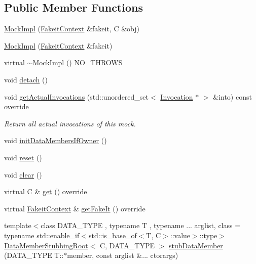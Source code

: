 \subsection*{Public Member Functions}
\begin{DoxyCompactItemize}
\item 
\mbox{\hyperlink{classfakeit_1_1MockImpl_aeabb99e36f2ef5fea7856db165fe01d3}{Mock\+Impl}} (\mbox{\hyperlink{structfakeit_1_1FakeitContext}{Fakeit\+Context}} \&fakeit, C \&obj)
\item 
\mbox{\hyperlink{classfakeit_1_1MockImpl_ae6f86001c16b110046453433ba2d36e8}{Mock\+Impl}} (\mbox{\hyperlink{structfakeit_1_1FakeitContext}{Fakeit\+Context}} \&fakeit)
\item 
virtual \mbox{\hyperlink{classfakeit_1_1MockImpl_aafbd9e9c1f6691f7cee440c52ae07220}{$\sim$\+Mock\+Impl}} () N\+O\+\_\+\+T\+H\+R\+O\+WS
\item 
void \mbox{\hyperlink{classfakeit_1_1MockImpl_a48e09b74451cf9c435aab31b077cce26}{detach}} ()
\item 
void \mbox{\hyperlink{classfakeit_1_1MockImpl_a04c3121eb7d380226f1beabf4b18ee82}{get\+Actual\+Invocations}} (std\+::unordered\+\_\+set$<$ \mbox{\hyperlink{structfakeit_1_1Invocation}{Invocation}} $\ast$ $>$ \&into) const override
\begin{DoxyCompactList}\small\item\em Return all actual invocations of this mock. \end{DoxyCompactList}\item 
void \mbox{\hyperlink{classfakeit_1_1MockImpl_ad403c33f4734e31196ead952fc4c4805}{init\+Data\+Members\+If\+Owner}} ()
\item 
void \mbox{\hyperlink{classfakeit_1_1MockImpl_aad69a9c36fc64d0890f21ff15318a206}{reset}} ()
\item 
void \mbox{\hyperlink{classfakeit_1_1MockImpl_a3985505d2ec7bd50a5d71f155c5ae458}{clear}} ()
\item 
virtual C \& \mbox{\hyperlink{classfakeit_1_1MockImpl_a8f287e857fde9a0941c618ff5459bd88}{get}} () override
\item 
virtual \mbox{\hyperlink{structfakeit_1_1FakeitContext}{Fakeit\+Context}} \& \mbox{\hyperlink{classfakeit_1_1MockImpl_a1b51dd1918a32ec5d450fc804ad37e63}{get\+Fake\+It}} () override
\item 
{\footnotesize template$<$class D\+A\+T\+A\+\_\+\+T\+Y\+PE , typename T , typename ... arglist, class  = typename std\+::enable\+\_\+if$<$std\+::is\+\_\+base\+\_\+of$<$\+T, C$>$\+::value$>$\+::type$>$ }\\\mbox{\hyperlink{classfakeit_1_1DataMemberStubbingRoot}{Data\+Member\+Stubbing\+Root}}$<$ C, D\+A\+T\+A\+\_\+\+T\+Y\+PE $>$ \mbox{\hyperlink{classfakeit_1_1MockImpl_acaa4bcb3984d3ca5fd1ecb3095393951}{stub\+Data\+Member}} (D\+A\+T\+A\+\_\+\+T\+Y\+PE T\+::$\ast$member, const arglist \&... ctorargs)

\end{DoxyCompactItemize}

